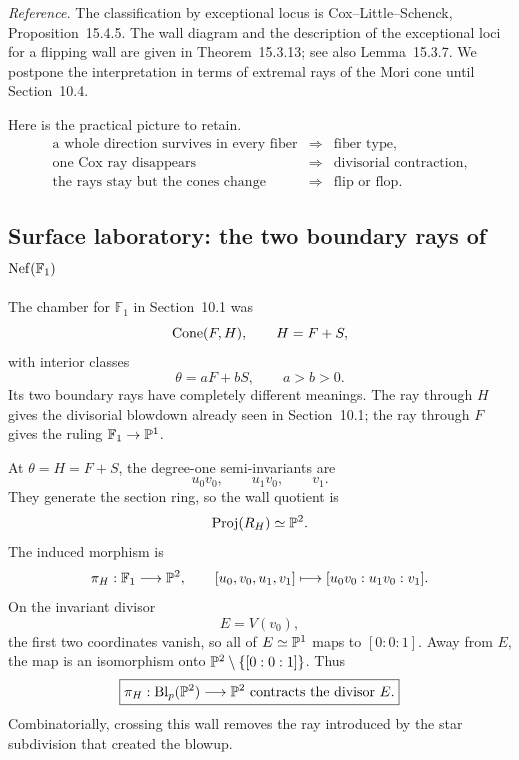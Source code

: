 \noindent
\textit{Reference.}
The classification by exceptional locus is
Cox--Little--Schenck, Proposition~15.4.5.  The wall diagram and the
description of the exceptional loci for a flipping wall are given in
Theorem~15.3.13; see also Lemma~15.3.7.  We postpone the interpretation
in terms of extremal rays of the Mori cone until Section~10.4.

Here is the practical picture to retain.
\[
\boxed{
\begin{array}{ccl}
\text{a whole direction survives in every fiber}
&\Longrightarrow&
\text{fiber type},
\\[1mm]
\text{one Cox ray disappears}
&\Longrightarrow&
\text{divisorial contraction},
\\[1mm]
\text{the rays stay but the cones change}
&\Longrightarrow&
\text{flip or flop}.
\end{array}}
\]

\subsection{Surface laboratory: the two boundary rays of
\texorpdfstring{\(\operatorname{Nef}(\mathbb F_1)\)}{Nef(F1)}}

The chamber for \(\mathbb F_1\) in Section~10.1 was
\[
\operatorname{Cone}(F,H),
\qquad
H=F+S,
\]
with interior classes
\[
\theta=aF+bS,
\qquad
a>b>0.
\]
Its two boundary rays have completely different meanings.  The ray
through \(H\) gives the divisorial blowdown already seen in
Section~10.1; the ray through \(F\) gives the ruling
\(\mathbb F_1\to\mathbb{P}^1\).

\begin{example}
At \(\theta=H=F+S\), the degree-one semi-invariants are
\[
u_0v_0,
\qquad
u_1v_0,
\qquad
v_1.
\]
They generate the section ring, so the wall quotient is
\[
\operatorname{Proj}(R_H)
\simeq
\mathbb{P}^2.
\]
The induced morphism is
\[
\pi_H:\mathbb F_1\longrightarrow\mathbb{P}^2,
\qquad
[u_0,v_0,u_1,v_1]
\longmapsto
[u_0v_0:u_1v_0:v_1].
\]
On the invariant divisor
\[
E=V(v_0),
\]
the first two coordinates vanish, so all of \(E\simeq\mathbb{P}^1\) maps to
\([0:0:1]\).  Away from \(E\), the map is an isomorphism onto
\(\mathbb{P}^2\setminus\{[0:0:1]\}\).  Thus
\[
\boxed{
\pi_H:
\operatorname{Bl}_p(\mathbb{P}^2)\longrightarrow\mathbb{P}^2
\text{ contracts the divisor }E.}
\]
Combinatorially, crossing this wall removes the ray introduced by the
star subdivision that created the blowup.
\end{example}

